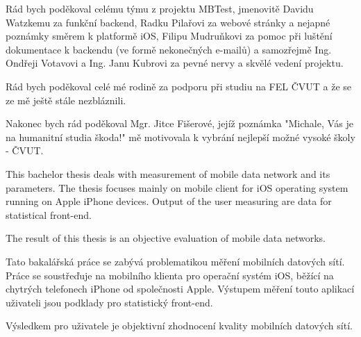 \documentclass[11pt,twoside,a4paper]{book}
\begin{document}

\coverpagestarts


\acknowledgements
\noindent
Rád bych poděkoval celému týmu z projektu MBTest, jmenovitě Davidu Watzkemu za funkční backend, Radku Pilařovi za webové stránky a nejapné poznámky směrem k platformě iOS, Filipu Mudruňkovi za pomoc při luštění dokumentace k backendu (ve formě nekonečných e-mailů) a samozřejmě Ing. Ondřeji Votavovi a Ing. Janu Kubrovi za pevné nervy a skvělé vedení projektu.

\bigbreak

Rád bych poděkoval celé mé rodině za podporu při studiu na FEL ČVUT a že se ze mě ještě stále nezbláznili.

\bigbreak

Nakonec bych rád poděkoval Mgr. Jitce Fišerové, jejíž poznámka "Michale, Vás je na humanitní studia škoda!" mě motivovala k vybrání nejlepší možné vysoké školy - ČVUT.




 
\abstractpage

This bachelor thesis deals with measurement of mobile data network and its parameters. The thesis focuses mainly on mobile client for iOS operating system running on Apple iPhone devices. Output of the user measuring are data for statistical front-end. 

The result of this thesis is an objective evaluation of mobile data networks.



\baselineskip

\noindent
Tato bakalářská práce se zabývá problematikou měření mobilních datových sítí. Práce se soustřeďuje na mobilního klienta pro operační systém iOS, běžící na chytrých telefonech iPhone od společnosti Apple. Výstupem měření touto aplikací uživateli jsou podklady pro statistický front-end. 

Výsledkem pro uživatele je objektivní zhodnocení kvality mobilních datových sítí.


\end{document}
